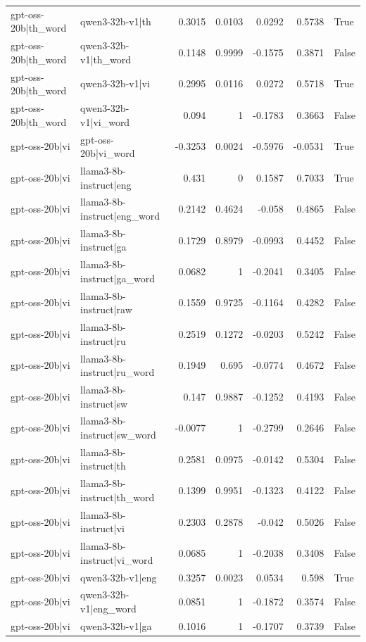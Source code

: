 \begin{table}
\begin{tabular}{l l r r r r l}
gpt-oss-20b|th_word & qwen3-32b-v1|th & 0.3015 & 0.0103 & 0.0292 & 0.5738 & True \\
gpt-oss-20b|th_word & qwen3-32b-v1|th_word & 0.1148 & 0.9999 & -0.1575 & 0.3871 & False \\
gpt-oss-20b|th_word & qwen3-32b-v1|vi & 0.2995 & 0.0116 & 0.0272 & 0.5718 & True \\
gpt-oss-20b|th_word & qwen3-32b-v1|vi_word & 0.094 & 1 & -0.1783 & 0.3663 & False \\
gpt-oss-20b|vi & gpt-oss-20b|vi_word & -0.3253 & 0.0024 & -0.5976 & -0.0531 & True \\
gpt-oss-20b|vi & llama3-8b-instruct|eng & 0.431 & 0 & 0.1587 & 0.7033 & True \\
gpt-oss-20b|vi & llama3-8b-instruct|eng_word & 0.2142 & 0.4624 & -0.058 & 0.4865 & False \\
gpt-oss-20b|vi & llama3-8b-instruct|ga & 0.1729 & 0.8979 & -0.0993 & 0.4452 & False \\
gpt-oss-20b|vi & llama3-8b-instruct|ga_word & 0.0682 & 1 & -0.2041 & 0.3405 & False \\
gpt-oss-20b|vi & llama3-8b-instruct|raw & 0.1559 & 0.9725 & -0.1164 & 0.4282 & False \\
gpt-oss-20b|vi & llama3-8b-instruct|ru & 0.2519 & 0.1272 & -0.0203 & 0.5242 & False \\
gpt-oss-20b|vi & llama3-8b-instruct|ru_word & 0.1949 & 0.695 & -0.0774 & 0.4672 & False \\
gpt-oss-20b|vi & llama3-8b-instruct|sw & 0.147 & 0.9887 & -0.1252 & 0.4193 & False \\
gpt-oss-20b|vi & llama3-8b-instruct|sw_word & -0.0077 & 1 & -0.2799 & 0.2646 & False \\
gpt-oss-20b|vi & llama3-8b-instruct|th & 0.2581 & 0.0975 & -0.0142 & 0.5304 & False \\
gpt-oss-20b|vi & llama3-8b-instruct|th_word & 0.1399 & 0.9951 & -0.1323 & 0.4122 & False \\
gpt-oss-20b|vi & llama3-8b-instruct|vi & 0.2303 & 0.2878 & -0.042 & 0.5026 & False \\
gpt-oss-20b|vi & llama3-8b-instruct|vi_word & 0.0685 & 1 & -0.2038 & 0.3408 & False \\
gpt-oss-20b|vi & qwen3-32b-v1|eng & 0.3257 & 0.0023 & 0.0534 & 0.598 & True \\
gpt-oss-20b|vi & qwen3-32b-v1|eng_word & 0.0851 & 1 & -0.1872 & 0.3574 & False \\
gpt-oss-20b|vi & qwen3-32b-v1|ga & 0.1016 & 1 & -0.1707 & 0.3739 & False \\

\end{tabular}
\end{table}
